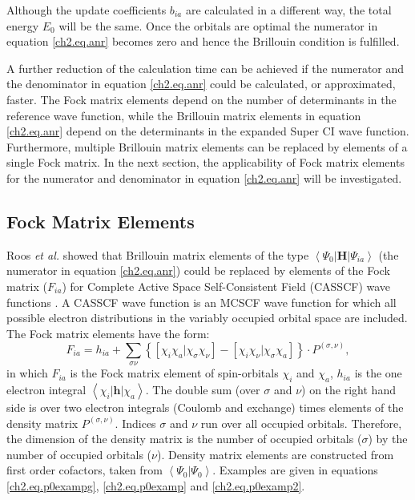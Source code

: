 Although the update coefficients $b_{ia}$ are calculated in a different way, the total energy $E_0$ will be the same. Once the orbitals are optimal the numerator in equation \ref{ch2.eq.anr} becomes zero and hence the Brillouin condition is fulfilled. 

A further reduction of the calculation time can be achieved if the numerator and the denominator in equation \ref{ch2.eq.anr} could be calculated, or approximated, faster. The Fock matrix elements depend on the number of determinants in the reference wave function, while the Brillouin matrix elements in equation \ref{ch2.eq.anr} depend on the determinants in the expanded Super CI wave function. Furthermore, multiple Brillouin matrix elements can be replaced by elements of a single Fock matrix. In the next section, the applicability of Fock matrix elements for the numerator and denominator in equation \ref{ch2.eq.anr} will be investigated.

\subsection{\label{ch2.sec.fock}Fock Matrix Elements} 

Roos \textit{et al.} showed that Brillouin matrix elements of the type $\left< \Psi_0 | \mathbf{H} | \Psi_{ia} \right>$ (the numerator in equation \ref{ch2.eq.anr}) could be replaced by elements of the Fock matrix ($F_{ia}$) for Complete Active Space Self-Consistent Field (CASSCF) wave functions \cite{roos1}. A CASSCF wave function is an MCSCF wave function for which all possible electron distributions in the variably occupied orbital space are included. The Fock matrix elements have the form:
\begin{equation}
F_{ia} = h_{ia} + \sum_{\sigma\nu} \left\{ \left[ \chi_i \chi_a | \chi_\sigma \chi_\nu \right] - \left[ \chi_i \chi_\nu | \chi_\sigma \chi_a \right] \right\} \cdot P^{(\sigma,\nu)},
\label{ch2.eq.fock}
\end{equation}
in which $F_{ia}$ is the Fock matrix element of spin-orbitals $\chi_i$ and $\chi_a$, $h_{ia}$ is the one electron integral $\left< \chi_i | \mathbf{h}| \chi_a \right>$. The double sum (over $\sigma$ and $\nu$) on the right hand side is over two electron integrals (Coulomb and exchange) times elements of the density matrix $P^{(\sigma,\nu)}$. Indices $\sigma$ and $\nu$ run over all occupied orbitals. Therefore, the dimension of the density matrix is the number of occupied orbitals ($\sigma$) by the number of occupied orbitals ($\nu$). Density matrix elements are constructed from first order cofactors, taken from $\left< \Psi_0 | \Psi_0 \right>$. Examples are given in equations \ref{ch2.eq.p0exampg}, \ref{ch2.eq.p0examp} and \ref{ch2.eq.p0examp2}.

